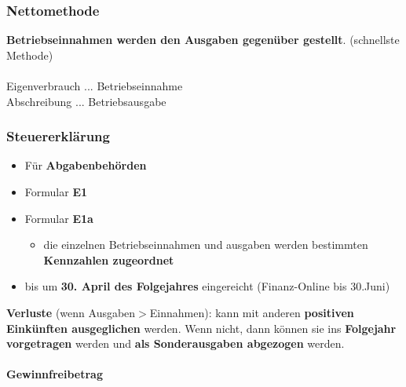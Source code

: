 \documentclass[a4paper, ngerman]{article}
\begin{document}
\subsubsection{Nettomethode}
\textbf{Betriebseinnahmen werden den Ausgaben gegenüber gestellt}. (schnellste Methode)\\ \\
Eigenverbrauch ... Betriebseinnahme \\
Abschreibung ... Betriebsausgabe
\subsubsection{Steuererklärung}
\begin{itemize}
    \item Für \textbf{Abgabenbehörden}
    \item Formular \textbf{E1}
    \item Formular \textbf{E1a}
          \begin{itemize}
              \item die einzelnen Betriebseinnahmen und ausgaben werden bestimmten \textbf{Kennzahlen zugeordnet}
          \end{itemize}
    \item bis um \textbf{30. April des Folgejahres} eingereicht (Finanz-Online bis 30.Juni)
\end{itemize}
\textbf{Verluste} (wenn Ausgaben$>$Einnahmen): kann mit anderen \textbf{positiven Einkünften ausgeglichen} werden. Wenn nicht, dann können sie ins \textbf{Folgejahr vorgetragen} werden
und \textbf{als Sonderausgaben abgezogen} werden.
\\ \\
\textbf{Gewinnfreibetrag}
\end{document}
